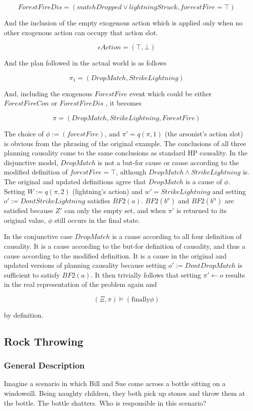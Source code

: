 \documentclass{article}
\theoremstyle{plain}
\theoremstyle{definition}
\begin{document}
\[
ForestFireDis = ( matchDropped \lor lightningStruck, forrestFire = \top )
\]

And the inclusion of the empty exogenous action which is applied only when no other exogenous action can occupy that action slot.

\[
\epsilon Action = (\top, \bot)
\]

And the plan followed in the actual world is as follows

\[
\pi_1 = (DropMatch, StrikeLightning)
\]

And, including the exogenous $ForestFire$ event which could be either $ForestFireCon$ or $ForestFireDis$ , it becomes

\[
\pi = (DropMatch, StrikeLightning, ForestFire)
\]

The choice of $\phi:=(forestFire)$, and $\pi'=q(\pi,1)$ (the arsonist's action slot) is obvious from the phrasing of the original example. The conclusions of all three planning causality come to the same conclusions as standard HP causality. In the disjunctive model, $DropMatch$ is not a but-for cause or cause according to the modified definition of $forestFire=\top$, although $DropMatch \land StrikeLightning$ is. The original and updated definitions agree that $DropMatch$ is a cause of $\phi$. Setting $W:= q(\pi,2)$ (lightning's action) and $w'=StrikeLightning$ and setting $o':= DontStrikeLightning$ satisfies $BF2(a)$. $BF2(b^o)$ and $BF2(b^u)$ are satisfied because $Z'$ can only the empty set, and when $\pi'$ is returned to its original value, $\phi$ still occurs in the final state.

In the conjunctive case $DropMatch$ is a cause according to all four definition of causality. It is a cause according to the but-for definition of causality, and thus a cause according to the modified definition. It is a cause in the original and updated versions of planning causality because setting $o':= DontDropMatch$ is sufficient to satisfy $BF2(a)$. It then trivially follows that setting $\pi' \leftarrow o$ results in the real representation of the problem again and

\[
(\Xi, \pi) \models (\textrm{finally} \phi)
\]

by definition.



\subsection{Rock Throwing} \label{sec:rockThrowing}
\subsubsection*{General Description}
Imagine a scenario in which Bill and Sue come across a bottle sitting on a windowsill. Being naughty children, they both pick up stones and throw them at the bottle. The bottle shatters. Who is responsible in this scenario?
\end{document}
